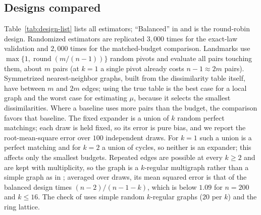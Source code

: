 \subsection{Designs compared}
\label{app:exp-details:designs}

Table~\ref{tab:design-list} lists all estimators; ``Balanced'' in  and  is the round-robin design. Randomized estimators are
replicated $3{,}000$ times for the exact-law validation and $2{,}000$ times for
the matched-budget comparison. Landmarks use $\max\{1,\operatorname{round}(m/(n-1))\}$
random pivots and evaluate all pairs touching them, about $m$ pairs (at $k=1$ a single pivot already costs $n-1\approx2m$ pairs). Symmetrized nearest-neighbor graphs, built from the dissimilarity table
itself, have between $m$ and $2m$ edges; using the true table is the best case for a local graph and the worst case for estimating $\mu$, because it selects the smallest dissimilarities. Where a baseline uses more pairs than the budget, the comparison favors that baseline. The fixed expander is a union of $k$ random perfect matchings; each draw is held fixed, so its error is pure bias, and we report the root-mean-square error over $100$ independent draws. For $k=1$ such a union is a perfect matching and for $k=2$ a union of cycles, so neither is an expander; this affects only the smallest budgets. Repeated edges are possible at every $k\ge2$ and are kept with multiplicity, so the graph is a $k$-regular multigraph rather than a simple graph as in ; averaged over draws, its mean squared error is that of the balanced design times $(n-2)/(n-1-k)$, which is below $1.09$ for $n=200$ and $k\le16$. The check of  uses simple random
$k$-regular graphs ($20$ per $k$) and the ring lattice.


